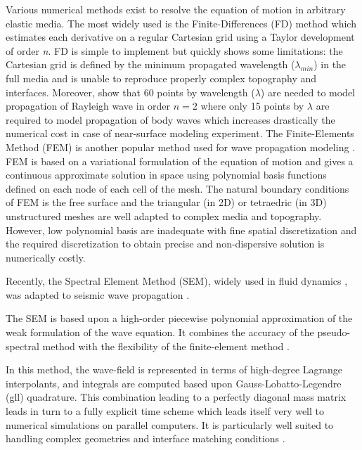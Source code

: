 \documentclass[manuscript,revised]{geophysics}
\begin{document}
\noindent Various numerical methods exist to resolve the equation of motion in arbitrary elastic media. The most widely used is the Finite-Differences (FD) method \citep{Virieux_PSV_1986,Levander_PSV_1988,Robertsson_FDM_1994,Pratt_EWM_1990,Stekl_VEM_1998,Saenger_FDM_2004} which estimates each derivative on a regular Cartesian grid using a Taylor development \citep{Moczo_FDM_2004} of order \textit{n}. FD is simple to implement but quickly shows some limitations: the Cartesian grid is defined by the minimum propagated wavelength ($\lambda_{min}$) in the full media and is unable to reproduce properly complex topography and interfaces. Moreover, \citet{Saenger_FDM_2000} show that 60 points by wavelength ($\lambda$) are needed to model propagation of Rayleigh wave in order $n=2$ where only 15 points by $\lambda$ are required to model propagation of body waves which increases drastically the numerical cost in case of near-surface modeling experiment. The Finite-Elements Method (FEM) is another popular method used for wave propagation modeling \citep{Lysmer_FEM_1972,Seron_FEM_1990,Hulbert_FEM_1990}. FEM is based on a variational formulation of the equation of motion and gives a continuous approximate solution in space using polynomial basis functions defined on each node of each cell of the mesh. The natural boundary conditions of FEM is the free surface and the triangular (in 2D) or tetraedric (in 3D) unstructured meshes are well adapted to complex media and topography. However, low polynomial basis are inadequate with fine spatial discretization and the required discretization to obtain precise and non-dispersive solution is numerically costly. 

\noindent Recently, the Spectral Element Method (SEM), widely used in fluid dynamics \citep{Patera_SEM_1984,Korczak_SEM_1986,Karniadakis_FEM_1989}, was adapted to seismic wave propagation \citep{Komatitsch_SEM_1998,Komatitsch_ISM_1999,Komatitsch_SEM_2005,Festa_PML_2005}. 

\noindent The SEM is based upon a high-order piecewise polynomial approximation of the weak formulation of the wave equation. It combines the accuracy of the pseudo-spectral method with the flexibility of the finite-element method \citep{Tromp_SEM_2008}. 

\noindent In this method, the wave-field is represented in terms of high-degree Lagrange interpolants, and integrals are computed based upon Gauss-Lobatto-Legendre (gll) quadrature. This combination leading to a perfectly diagonal mass matrix leads in turn to a fully explicit time scheme which leads itself very well to numerical simulations on parallel computers. It is particularly well suited to handling complex geometries and interface matching conditions \citep{Cristini_SEM_2012}. 
\end{document}
